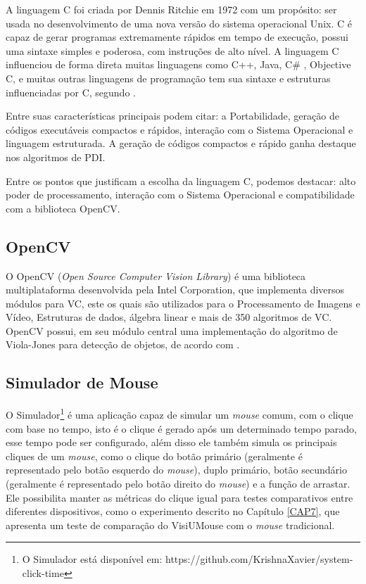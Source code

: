 A linguagem C foi criada por Dennis Ritchie em 1972 com um propósito: ser usada no desenvolvimento de uma nova versão do sistema operacional Unix. C é capaz de gerar programas extremamente rápidos em tempo de execução, possui uma sintaxe simples e poderosa, com instruções de alto nível. A linguagem C influenciou de forma direta muitas linguagens como C++, Java, C\# , Objective C, e muitas outras linguagens de programação tem sua sintaxe e estruturas influenciadas por C, segundo .

Entre suas características principais podem citar: a Portabilidade, geração de códigos executáveis compactos e rápidos, interação com o Sistema Operacional e linguagem estruturada. A geração de códigos compactos e rápido ganha destaque nos algoritmos de PDI.

Entre os pontos que justificam a escolha da linguagem C, podemos destacar: alto poder de processamento, interação com o Sistema Operacional e compatibilidade com a biblioteca OpenCV.

\subsection{OpenCV}

O OpenCV (\textit{Open Source Computer Vision Library}) é uma biblioteca multiplataforma desenvolvida pela Intel Corporation, que implementa diversos módulos para VC, este os quais são utilizados para o Processamento de Imagens e Vídeo, Estruturas de dados, álgebra linear e mais de 350 algoritmos de VC. OpenCV possui, em seu módulo central uma implementação do algoritmo de Viola-Jones para detecção de objetos, de acordo com \cite{bradski2008learning}.

\subsection{Simulador de Mouse}

O Simulador\footnote{O Simulador está disponível em: https://github.com/KrishnaXavier/system-click-time} é uma aplicação capaz de simular um \textit{mouse} comum, com o clique com base no tempo, isto é o clique é gerado após um determinado tempo parado, esse tempo pode ser configurado, além disso ele também simula os principais cliques de um \textit{mouse}, como o clique do botão primário (geralmente é representado pelo botão esquerdo do \textit{mouse}), duplo primário, botão secundário (geralmente é representado pelo botão direito do \textit{mouse}) e a função de arrastar. Ele possibilita manter as métricas do clique igual para testes comparativos entre diferentes dispositivos, como o experimento descrito no Capítulo \ref{CAP7}, que apresenta um teste de comparação do VisiUMouse com o \textit{mouse} tradicional.


